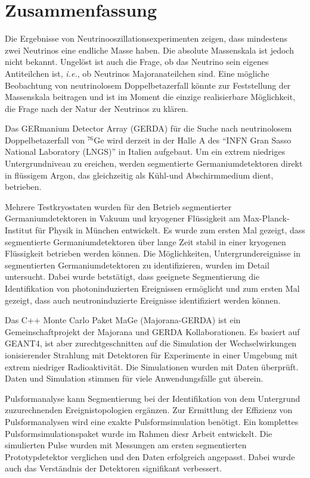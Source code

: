 \clearpage 
 
\section*{Zusammenfassung} 
Die Ergebnisse von Neutrinooszillationsexperimenten zeigen, dass
mindestens zwei Neutrinos eine endliche Masse haben. Die absolute
Massenskala ist jedoch nicht bekannt. Ungel\"ost ist auch die Frage,
ob das Neutrino sein eigenes Antiteilchen ist, \textit{i.e.}, ob
Neutrinos Majoranateilchen sind. Eine m\"ogliche Beobachtung von
neutrinolosem Doppelbetazerfall k\"onnte zur Feststellung der
Massenskala beitragen und ist im Moment die einzige realisierbare
M\"oglichkeit, die Frage nach der Natur der Neutrinos zu kl\"aren.
  
Das GERmanium Detector Array (GERDA) f\"ur die Suche nach
neutrinolosem Doppelbetazerfall von $^{76}$Ge wird derzeit in der
Halle A des ``INFN Gran Sasso National Laboratory (LNGS)'' in Italien
aufgebaut. Um ein extrem niedriges Untergrundniveau zu ereichen,
werden segmentierte Germaniumdetektoren direkt in fl\"ussigem Argon,
das gleichzeitig als K\"uhl-und Abschirmmedium dient, betrieben.

Mehrere Testkryostaten wurden f\"ur den Betrieb segmentierter
Germaniumdetektoren in Vakuum und kryogener Fl\"ussigkeit am
Max-Planck-Institut f\"ur Physik in M\"unchen entwickelt. Es wurde zum
ersten Mal gezeigt, dass segmentierte Germaniumdetektoren \"uber lange
Zeit stabil in einer kryogenen Fl\"ussigkeit betrieben werden
k\"onnen. Die M\"oglichkeiten, Untergrundereignisse in segmentierten
Germaniumdetektoren zu identifizieren, wurden im Detail untersucht.
Dabei wurde betst\"atigt, dass geeignete Segmentierung die
Identifikation von photoninduzierten Ereignissen erm\"oglicht und zum
ersten Mal gezeigt, dass auch neutroninduzierte Ereignisse
identifiziert werden k\"onnen.

Das C++ Monte Carlo Paket MaGe (Majorana-GERDA) ist ein
Gemeinschaftprojekt der Majorana und GERDA Kollaborationen. Es basiert
auf GEANT4, ist aber zurechtgeschnitten auf die Simulation der
Wechselwirkungen ionisierender Strahlung mit Detektoren f\"ur
Experimente in einer Umgebung mit extrem niedriger Radioaktivit\"at.
Die Simulationen wurden mit Daten \"uberpr\"uft. Daten und Simulation
stimmen f\"ur viele Anwendungsf\"alle gut \"uberein.

Pulsformanalyse kann Segmentierung bei der Identifikation von dem
Untergrund zuzurechnenden Ereignistopologien erg\"anzen. Zur
Ermittlung der Effizienz von Pulsformanalysen wird eine exakte
Pulsformsimulation ben\"otigt. Ein komplettes Pulsformsimulationspaket
wurde im Rahmen diesr Arbeit entwickelt. Die simulierten Pulse wurden
mit Messungen am ersten segmentierten Prototypdetektor verglichen und
den Daten erfolgreich angepasst. Dabei wurde auch das Verst\"andnis
der Detektoren signifikant verbessert.
 
\clearpage 
 

